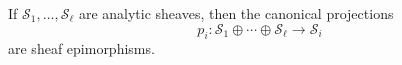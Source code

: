 If $\mathcal{S}_1, \ldots, \mathcal{S}_\ell$ are analytic sheaves, then the canonical projections
$$
p_i: \mathcal{S}_1 \oplus \cdots \oplus \mathcal{S}_\ell \rightarrow \mathcal{S}_i
$$
are sheaf epimorphisms.
